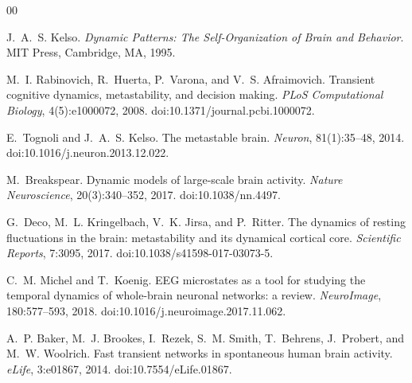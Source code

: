 \documentclass[5p,twocolumn,authoryear]{elsarticle}
\begin{document}


% 

\begin{thebibliography}{00}

J.~A.~S. Kelso.
\newblock \emph{Dynamic Patterns: The Self-Organization of Brain and Behavior}.
\newblock MIT Press, Cambridge, MA, 1995.

M.~I. Rabinovich, R.~Huerta, P.~Varona, and V.~S. Afraimovich.
\newblock Transient cognitive dynamics, metastability, and decision making.
\newblock \emph{PLoS Computational Biology}, 4(5):e1000072, 2008.
\newblock doi:10.1371/journal.pcbi.1000072.

E.~Tognoli and J.~A.~S. Kelso.
\newblock The metastable brain.
\newblock \emph{Neuron}, 81(1):35--48, 2014.
\newblock doi:10.1016/j.neuron.2013.12.022.

M.~Breakspear.
\newblock Dynamic models of large-scale brain activity.
\newblock \emph{Nature Neuroscience}, 20(3):340--352, 2017.
\newblock doi:10.1038/nn.4497.

G.~Deco, M.~L. Kringelbach, V.~K. Jirsa, and P.~Ritter.
\newblock The dynamics of resting fluctuations in the brain: metastability and its dynamical cortical core.
\newblock \emph{Scientific Reports}, 7:3095, 2017.
\newblock doi:10.1038/s41598-017-03073-5.

C.~M. Michel and T.~Koenig.
\newblock EEG microstates as a tool for studying the temporal dynamics of whole-brain neuronal networks: a review.
\newblock \emph{NeuroImage}, 180:577--593, 2018.
\newblock doi:10.1016/j.neuroimage.2017.11.062.

A.~P. Baker, M.~J. Brookes, I.~Rezek, S.~M. Smith, T.~Behrens, J.~Probert, and M.~W. Woolrich.
\newblock Fast transient networks in spontaneous human brain activity.
\newblock \emph{eLife}, 3:e01867, 2014.
\newblock doi:10.7554/eLife.01867.


\end{thebibliography}
\end{document}
